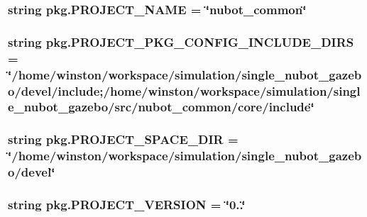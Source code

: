 \hypertarget{namespacepkg_a7dfbe99257c26f5e4a3a5483995d9ddc}{
\subsubsection[{P\-R\-O\-J\-E\-C\-T\-\_\-\-N\-A\-M\-E}]{\setlength{\rightskip}{0pt plus 5cm}string pkg.\-P\-R\-O\-J\-E\-C\-T\-\_\-\-N\-A\-M\-E = \char`\"{}nubot\-\_\-common\char`\"{}}}\label{namespacepkg_a7dfbe99257c26f5e4a3a5483995d9ddc}
\hypertarget{namespacepkg_a2760bf8266ff58da440f65ee91b203ab}{
\subsubsection[{P\-R\-O\-J\-E\-C\-T\-\_\-\-P\-K\-G\-\_\-\-C\-O\-N\-F\-I\-G\-\_\-\-I\-N\-C\-L\-U\-D\-E\-\_\-\-D\-I\-R\-S}]{\setlength{\rightskip}{0pt plus 5cm}string pkg.\-P\-R\-O\-J\-E\-C\-T\-\_\-\-P\-K\-G\-\_\-\-C\-O\-N\-F\-I\-G\-\_\-\-I\-N\-C\-L\-U\-D\-E\-\_\-\-D\-I\-R\-S = \char`\"{}/home/winston/workspace/simulation/single\-\_\-nubot\-\_\-gazebo/devel/include;/home/winston/workspace/simulation/single\-\_\-nubot\-\_\-gazebo/src/nubot\-\_\-common/core/include\char`\"{}}}\label{namespacepkg_a2760bf8266ff58da440f65ee91b203ab}
\hypertarget{namespacepkg_a3f0f1b4bc03c596525e025539ca4332f}{
\subsubsection[{P\-R\-O\-J\-E\-C\-T\-\_\-\-S\-P\-A\-C\-E\-\_\-\-D\-I\-R}]{\setlength{\rightskip}{0pt plus 5cm}string pkg.\-P\-R\-O\-J\-E\-C\-T\-\_\-\-S\-P\-A\-C\-E\-\_\-\-D\-I\-R = \char`\"{}/home/winston/workspace/simulation/single\-\_\-nubot\-\_\-gazebo/devel\char`\"{}}}\label{namespacepkg_a3f0f1b4bc03c596525e025539ca4332f}
\hypertarget{namespacepkg_ab1037914b9286bb61855131c06149648}{
\subsubsection[{P\-R\-O\-J\-E\-C\-T\-\_\-\-V\-E\-R\-S\-I\-O\-N}]{\setlength{\rightskip}{0pt plus 5cm}string pkg.\-P\-R\-O\-J\-E\-C\-T\-\_\-\-V\-E\-R\-S\-I\-O\-N = \char`\"{}0..\char`\"{}}}\label{namespacepkg_ab1037914b9286bb61855131c06149648}
